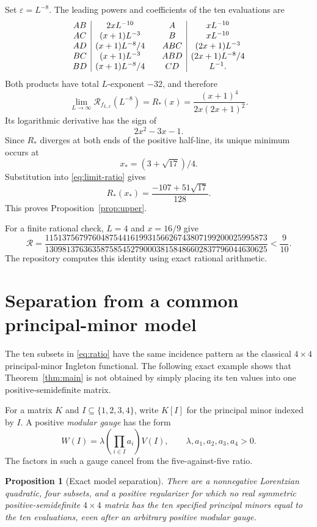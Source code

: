 \documentclass[11pt]{article}
\newtheorem{proposition}[theorem]{Proposition}
\theoremstyle{remark}
\begin{document}
Set $\varepsilon=L^{-8}$.  The leading powers and coefficients of the ten
evaluations are
\[
\begin{array}{c|c@{\qquad}c|c}
AB&2xL^{-10}&A&xL^{-10}\\
AC&(x+1)L^{-3}&B&xL^{-10}\\
AD&(x+1)L^{-8}/4&ABC&(2x+1)L^{-3}\\
BC&(x+1)L^{-3}&ABD&(2x+1)L^{-8}/4\\
BD&(x+1)L^{-8}/4&CD&L^{-1}.
\end{array}
\]
Both products have total $L$-exponent $-32$, and therefore
\begin{equation}
 \lim_{L\to\infty}\mathcal R_{f_{L,x}}(L^{-8})
 =R_*(x)=\frac{(x+1)^4}{2x(2x+1)^2}.
 \label{eq:limit-ratio}
\end{equation}
Its logarithmic derivative has the sign of
\[
 2x^2-3x-1.
\]
Since $R_*$ diverges at both ends of the positive half-line, its unique
minimum occurs at
\[
 x_*=(3+\sqrt{17})/4.
\]
Substitution into \eqref{eq:limit-ratio} gives
\[
 R_*(x_*)=\frac{-107+51\sqrt{17}}{128}.
\]
This proves Proposition~\ref{prop:upper}.

For a finite rational check, $L=4$ and $x=16/9$ give
\[
 \mathcal R=
 \frac{1151375679760487544161993156626743807199200025995873}
 {1309813763635875854527900038158486602837796044630625}
 <\frac9{10}.
\]
The repository computes this identity using exact rational arithmetic.

\section{Separation from a common principal-minor model}

The ten subsets in \eqref{eq:ratio} have the same incidence pattern as the
classical $4\times4$ principal-minor Ingleton functional.  The following
exact example shows that Theorem~\ref{thm:main} is not obtained by simply
placing its ten values into one positive-semidefinite matrix.

For a matrix $K$ and $I\subseteq\{1,2,3,4\}$, write $K[I]$ for the principal
minor indexed by $I$.  A positive \emph{modular gauge} has the form
\[
 W(I)=\lambda\left(\prod_{i\in I}a_i\right)V(I),
 \qquad \lambda,a_1,a_2,a_3,a_4>0.
\]
The factors in such a gauge cancel from the five-against-five ratio.

\begin{proposition}[Exact model separation]
\label{prop:separation}
There are a nonnegative Lorentzian quadratic, four subsets, and a positive
regularizer for which no real symmetric positive-semidefinite $4\times4$
matrix has the ten specified principal minors equal to the ten evaluations,
even after an arbitrary positive modular gauge.
\end{proposition}
\end{document}
